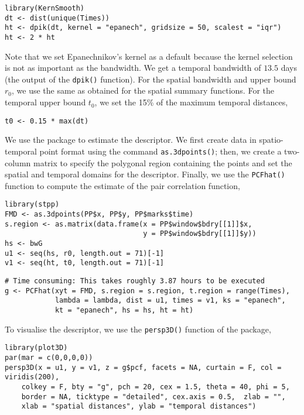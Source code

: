 \begin{verbatim}
library(KernSmooth)
dt <- dist(unique(Times))
ht <- dpik(dt, kernel = "epanech", gridsize = 50, scalest = "iqr")
ht <- 2 * ht
\end{verbatim}

Note that we set Epanechnikov's kernel as a default because the kernel selection is not as important as the bandwidth. We get a temporal bandwidth of \(13.5\) days (the output of the \texttt{dpik()} function). For the spatial bandwidth and upper bound \(r_0\), we use the same as obtained for the spatial summary functions. For the temporal upper bound \(t_0\), we set the 15\% of the maximum temporal distances,

\begin{verbatim}
t0 <- 0.15 * max(dt)
\end{verbatim}

We use the  package to estimate the descriptor. We first create data in spatio-temporal point format using the command \texttt{as.3dpoints()}; then, we create a two-column matrix to specify the polygonal region containing the points and set the spatial and temporal domains for the descriptor. Finally, we use the \texttt{PCFhat()} function to compute the estimate of the pair correlation function,

\begin{verbatim}
library(stpp)
FMD <- as.3dpoints(PP$x, PP$y, PP$marks$time)
s.region <- as.matrix(data.frame(x = PP$window$bdry[[1]]$x, 
                                 y = PP$window$bdry[[1]]$y))
hs <- bwG
u1 <- seq(hs, r0, length.out = 71)[-1]
v1 <- seq(ht, t0, length.out = 71)[-1]
\end{verbatim}

\begin{verbatim}
# Time consuming: This takes roughly 3.87 hours to be executed
g <- PCFhat(xyt = FMD, s.region = s.region, t.region = range(Times), 
            lambda = lambda, dist = u1, times = v1, ks = "epanech", 
            kt = "epanech", hs = hs, ht = ht)
\end{verbatim}

To visualise the descriptor, we use the \texttt{persp3D()} function of the  package,

\begin{verbatim}
library(plot3D)
par(mar = c(0,0,0,0))
persp3D(x = u1, y = v1, z = g$pcf, facets = NA, curtain = F, col =  viridis(200), 
    colkey = F, bty = "g", pch = 20, cex = 1.5, theta = 40, phi = 5, 
    border = NA, ticktype = "detailed", cex.axis = 0.5,  zlab = "",
    xlab = "spatial distances", ylab = "temporal distances")
\end{verbatim}

